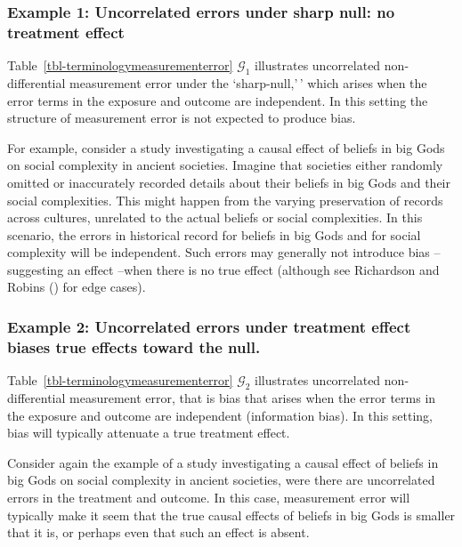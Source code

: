 \documentclass[
  single column]{article}
\begin{document}
\subsubsection{Example 1: Uncorrelated errors under sharp null: no
treatment
effect}\label{example-1-uncorrelated-errors-under-sharp-null-no-treatment-effect}

Table~\ref{tbl-terminologymeasurementerror} \(\mathcal{G}_1\)
illustrates uncorrelated non-differential measurement error under the
`sharp-null,'\,' which arises when the error terms in the exposure and
outcome are independent. In this setting the structure of measurement
error is not expected to produce bias.

For example, consider a study investigating a causal effect of beliefs
in big Gods on social complexity in ancient societies. Imagine that
societies either randomly omitted or inaccurately recorded details about
their beliefs in big Gods and their social complexities. This might
happen from the varying preservation of records across cultures,
unrelated to the actual beliefs or social complexities. In this
scenario, the errors in historical record for beliefs in big Gods and
for social complexity will be independent. Such errors may generally not
introduce bias -- suggesting an effect --when there is no true effect
(although see Richardson and Robins
() for edge cases).

\subsubsection{Example 2: Uncorrelated errors under treatment effect
biases true effects toward the
null.}\label{example-2-uncorrelated-errors-under-treatment-effect-biases-true-effects-toward-the-null.}

Table~\ref{tbl-terminologymeasurementerror} \(\mathcal{G}_2\)
illustrates uncorrelated non-differential measurement error, that is
bias that arises when the error terms in the exposure and outcome are
independent (information bias). In this setting, bias will typically
attenuate a true treatment effect.

Consider again the example of a study investigating a causal effect of
beliefs in big Gods on social complexity in ancient societies, were
there are uncorrelated errors in the treatment and outcome. In this
case, measurement error will typically make it seem that the true causal
effects of beliefs in big Gods is smaller that it is, or perhaps even
that such an effect is absent.
\end{document}
